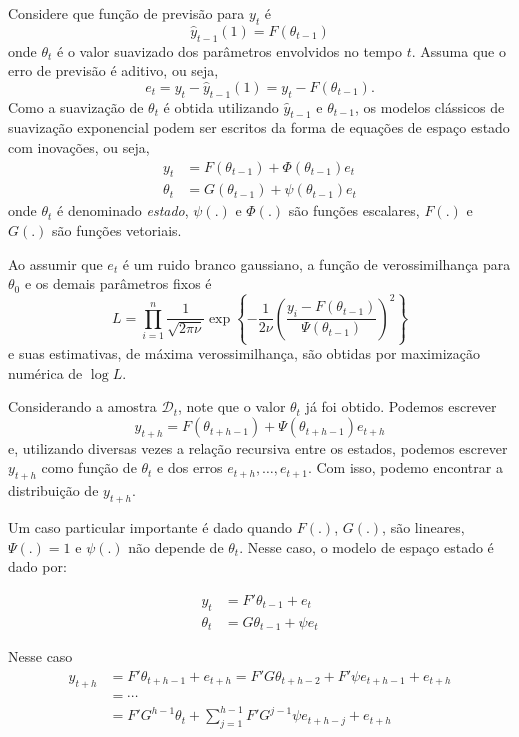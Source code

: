 \documentclass[
  letterpaper,
  DIV=11,
  numbers=noendperiod]{scrartcl}
\theoremstyle{definition}
\theoremstyle{definition}
\theoremstyle{plain}
\theoremstyle{plain}
\theoremstyle{remark}
\begin{document}
Considere que função de previsão para \(y_t\) é
\[\hat{y}_{t-1}(1)=F(\theta_{t-1})\] onde \(\theta_t\) é o valor
suavizado dos parâmetros envolvidos no tempo \(t\). Assuma que o erro de
previsão é aditivo, ou seja,
\[e_t=y_t-\hat{y}_{t-1}(1)=y_t-F(\theta_{t-1}).\] Como a suavização de
\(\theta_t\) é obtida utilizando \(\hat{y}_{t-1}\) e \(\theta_{t-1}\),
os modelos clássicos de suavização exponencial podem ser escritos da
forma de equações de espaço estado com inovações, ou seja,
\begin{align}y_t&=F(\theta_{t-1})+\Phi(\theta_{t-1}) e_t\\
\theta_t&= G(\theta_{t-1})+\psi(\theta_{t-1})e_t
\end{align} onde \(\theta_t\) é denominado \emph{estado}, \(\psi(.)\) e
\(\Phi(.)\) são funções escalares, \(F(.)\) e \(G(.)\) são funções
vetoriais.

Ao assumir que \(e_t\) é um ruido branco gaussiano, a função de
verossimilhança para \(\theta_0\) e os demais parâmetros fixos é
\[L=\prod_{i=1}^n\frac{1}{\sqrt{2\pi\nu}}\exp\left\{-\frac{1}{2\nu}\left(\frac{y_i-F(\theta_{t-1})}{\Psi(\theta_{t-1})}\right)^2\right\}\]
e suas estimativas, de máxima verossimilhança, são obtidas por
maximização numérica de \(\log L\).

Considerando a amostra \(\mathcal{D}_t\), note que o valor \(\theta_t\)
já foi obtido. Podemos escrever
\[y_{t+h}=F(\theta_{t+h-1})+\Psi(\theta_{t+h-1})e_{t+h}\] e, utilizando
diversas vezes a relação recursiva entre os estados, podemos escrever
\(y_{t+h}\) como função de \(\theta_t\) e dos erros
\(e_{t+h},\ldots, e_{t+1}\). Com isso, podemo encontrar a distribuição
de \(y_{t+h}\).

Um caso particular importante é dado quando \(F(.)\), \(G(.)\), são
lineares,\(\Psi(.)=1\) e \(\psi(.)\) não depende de \(\theta_t\). Nesse
caso, o modelo de espaço estado é dado por:

\begin{align}y_t&=F'\theta_{t-1}+e_t\\
\theta_t&= G\theta_{t-1}+\psi e_t
\end{align}

Nesse caso\begin{align}
y_{t+h}&=F'\theta_{t+h-1}+e_{t+h}=F'G\theta_{t+h-2}+F'\psi e_{t+h-1} + e_{t+h}\\
&=\cdots\\
&=F'G^{h-1}\theta_t+\sum_{j=1}^{h-1}F'G^{j-1}\psi e_{t+h-j}+e_{t+h}
\end{align}
\end{document}
